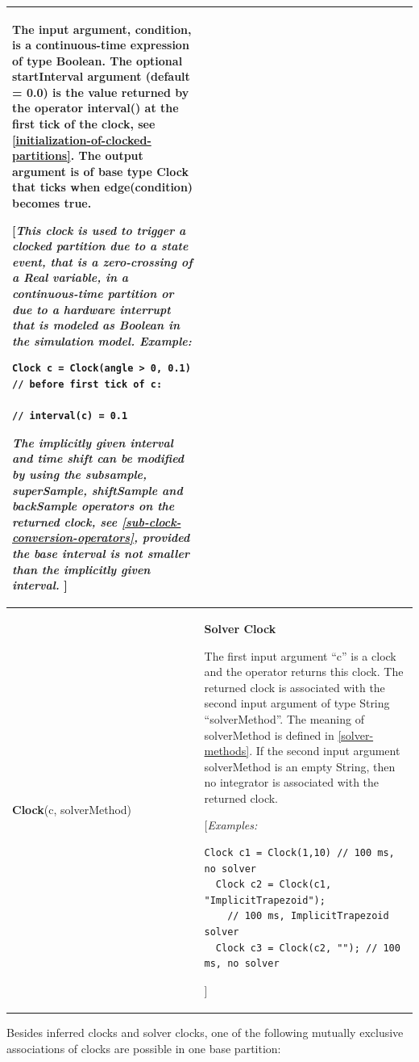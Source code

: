 \documentclass[10pt,a4paper]{report}
\begin{document}
\begin{longtable}[]{|p{3cm}|p{11cm}|}
The input argument, condition, is a continuous-time expression of type
Boolean. The optional startInterval argument (default = 0.0) is the
value returned by the operator \textbf{interval}() at the first tick of
the clock, see \ref{initialization-of-clocked-partitions}. The output argument is of base type Clock
that ticks when \textbf{edge}(condition) becomes true.

{[}\emph{This clock is used to trigger a clocked partition due to a
state event, that is a zero-crossing of a Real variable, in a
continuous-time partition or due to a hardware interrupt that is modeled
as Boolean in the simulation model. Example:}

\begin{lstlisting}[language=modelica]
  Clock c = Clock(angle > 0, 0.1) // before first tick of c:
                                  // interval(c) = 0.1
\end{lstlisting}

\emph{The implicitly given interval and time shift can be modified by
using the subsample, superSample, shiftSample and backSample operators
on the returned clock, see \ref{sub-clock-conversion-operators}, provided the base
interval is not smaller than the implicitly given interval.} {]}
\\ \hline
\textbf{Clock}(c,
solverMethod)
&
\textbf{Solver Clock}

The first input argument ``c'' is a clock and the operator returns this
clock. The returned clock is associated with the second input argument
of type String ``solverMethod''. The meaning of solverMethod is defined
in \ref{solver-methods}. If the second input argument solverMethod is an empty
String, then no integrator is associated with the returned clock.

{[}\emph{Examples:}
\begin{lstlisting}[language=modelica]
  Clock c1 = Clock(1,10) // 100 ms, no solver
  Clock c2 = Clock(c1, "ImplicitTrapezoid"); 
    // 100 ms, ImplicitTrapezoid solver 
  Clock c3 = Clock(c2, ""); // 100 ms, no solver
\end{lstlisting}
{]}\strut
\\ \hline

\end{longtable}

Besides inferred clocks and solver clocks, one of the following mutually
exclusive associations of clocks are possible in one base partition:
\end{document}
